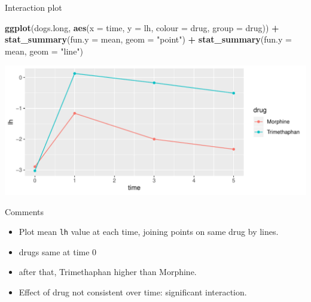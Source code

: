 \documentclass[ignorenonframetext,]{beamer}
\newenvironment{Shaded}{\begin{snugshade}}{\end{snugshade}}
\newcommand{\DataTypeTok}[1]{\textcolor[rgb]{0.13,0.29,0.53}{#1}}
\newcommand{\KeywordTok}[1]{\textcolor[rgb]{0.13,0.29,0.53}{\textbf{#1}}}
\newcommand{\NormalTok}[1]{#1}
\newcommand{\OperatorTok}[1]{\textcolor[rgb]{0.81,0.36,0.00}{\textbf{#1}}}
\newcommand{\StringTok}[1]{\textcolor[rgb]{0.31,0.60,0.02}{#1}}
\begin{document}
\begin{frame}[fragile]{Interaction plot}
\protect\hypertarget{interaction-plot-3}{}

\small

\begin{Shaded}
\begin{Highlighting}[]
\KeywordTok{ggplot}\NormalTok{(dogs.long, }\KeywordTok{aes}\NormalTok{(}\DataTypeTok{x =}\NormalTok{ time, }\DataTypeTok{y =}\NormalTok{ lh, }
                      \DataTypeTok{colour =}\NormalTok{ drug, }\DataTypeTok{group =}\NormalTok{ drug)) }\OperatorTok{+}
\StringTok{  }\KeywordTok{stat_summary}\NormalTok{(}\DataTypeTok{fun.y =}\NormalTok{ mean, }\DataTypeTok{geom =} \StringTok{"point"}\NormalTok{) }\OperatorTok{+}
\StringTok{  }\KeywordTok{stat_summary}\NormalTok{(}\DataTypeTok{fun.y =}\NormalTok{ mean, }\DataTypeTok{geom =} \StringTok{"line"}\NormalTok{)}
\end{Highlighting}
\end{Shaded}

\includegraphics{figure/unnamed-chunk-273-1.pdf} \normalsize

\end{frame}

\begin{frame}[fragile]{Comments}
\protect\hypertarget{comments-21}{}

\begin{itemize}
\item
  Plot mean \texttt{lh} value at each time, joining points on same drug
  by lines.
\item
  drugs same at time 0
\item
  after that, Trimethaphan higher than Morphine.
\item
  Effect of drug not consistent over time: significant interaction.
\end{itemize}

\end{frame}
\end{document}

